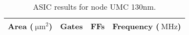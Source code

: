 \ifdefined\ASIC
\begin{table}[H]
\centering
\begin{tabular}{|c|c|c|c|}
\hline
\rowcolor{iob-green}
\textbf{Area} ($\SI{}{\micro\meter\squared}$)  & \textbf{Gates}  & \textbf{FFs}  & \textbf{Frequency} ($\SI{}{\mega\hertz}$)\\
\hline
\hline

\end{tabular}
\caption{ASIC results for node UMC 130nm.}
\label{tab:asic_results}
\end{table}
\fi
